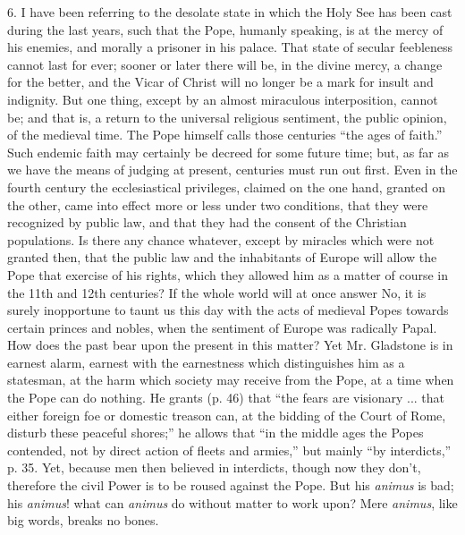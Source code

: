 6. I have been referring to the desolate state in which the Holy See
has been cast during the last years, such that the Pope, humanly
speaking, is at the mercy of his enemies, and morally a prisoner in his
palace. That state of secular feebleness cannot last for ever; sooner or
later there will be, in the divine mercy, a change for the better, and
the Vicar of Christ will no longer be a mark for insult and indignity.
But one thing, except by an almost miraculous interposition, cannot be;
and that is, a return to the universal religious sentiment, the public
opinion, of the medieval time. The Pope himself calls those centuries
``the ages of faith.'' Such endemic faith may certainly be
decreed for some future time; but, as far as we have the means of
judging at present, centuries must run out first. Even in the
fourth century the ecclesiastical privileges, claimed on the one hand,
granted on the other, came into effect more or less under two
conditions, that they were recognized by public law, and that they had
the consent of the Christian populations. Is there any chance whatever,
except by miracles which were not granted then, that the public law and
the inhabitants of Europe will allow the Pope that exercise of his
rights, which they allowed him as a matter of course in the 11th and
12th centuries? If the whole world will at once answer No, it is surely
inopportune to taunt us this day with the acts of medieval Popes towards
certain princes and nobles, when the sentiment of Europe was radically
Papal. How does the past bear upon the present in this matter? Yet Mr.
Gladstone is in earnest alarm, earnest with the earnestness which
distinguishes him as a statesman, at the harm which society may receive
from the Pope, at a time when the Pope can do nothing. He grants (p. 46)
that ``the fears are visionary ... that either foreign foe or
domestic treason can, at the bidding of the Court of Rome, disturb these
peaceful shores;'' he allows that ``in the middle ages the Popes
contended, not by direct action of fleets and armies,'' but mainly
``by interdicts,'' p. 35. Yet, because men then believed in
interdicts, though now they don't, therefore the civil Power is to be
roused against the Pope. But his \emph{animus} is bad; his \emph{animus}!
what can \emph{animus} do without matter to work upon? Mere \emph{animus},
like big words, breaks no bones.

